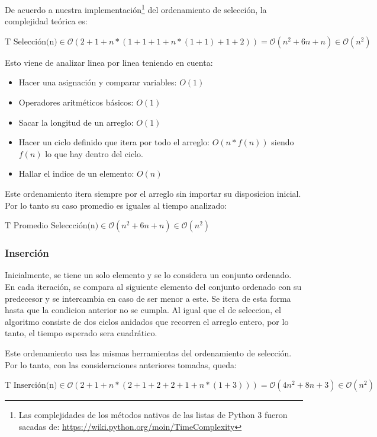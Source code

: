 \documentclass[article,a4paper]{article}
\begin{document}
De acuerdo a nuestra implementación\footnote{Las complejidades de los métodos nativos de las listas de Python 3 fueron sacadas de: \url{https://wiki.python.org/moin/TimeComplexity}} del ordenamiento de selección, la complejidad teórica es:

$\mbox{T Selección(n)} \in \mathcal O(2 + 1 + n * (1 + 1 + 1 + n * (1 + 1) + 1 + 2)) = \mathcal O(n^2 + 6n + n) \in \mathcal O(n^2)$

Esto viene de analizar linea por linea teniendo en cuenta:
\begin{itemize}
\item Hacer una asignación y comparar variables: $O(1)$
\item Operadores aritméticos básicos: $O(1)$
\item Sacar la longitud de un arreglo: $O(1)$
\item Hacer un ciclo definido que itera por todo el arreglo: $O(n * f(n))$ siendo $f(n)$ lo que hay dentro del ciclo.
\item Hallar el indice de un elemento: $O(n)$
\end{itemize}

Este ordenamiento itera siempre por el arreglo sin importar su disposicion inicial. Por lo tanto su caso promedio es iguales al tiempo analizado:

$\mbox{T Promedio Seleccción(n)} \in \mathcal O(n^2 + 6n + n) \in \mathcal O(n^2)$


\subsubsection{Inserción}

Inicialmente, se tiene un solo elemento y se lo considera un conjunto ordenado. En cada iteración, se compara al siguiente elemento del conjunto ordenado con su predecesor y se intercambia en caso de ser menor a este. Se itera de esta forma hasta que la condicion anterior no se cumpla. Al igual que el de seleccion, el algoritmo consiste de dos ciclos anidados que recorren el arreglo entero, por lo tanto, el tiempo esperado sera cuadrático.

Este ordenamiento usa las mismas herramientas del ordenamiento de selección. Por lo tanto, con las consideraciones anteriores tomadas, queda:

$\mbox{T Inserción(n)} \in \mathcal O( 2 + 1 + n * (2 + 1 + 2 + 2 + 1 + n * (1 + 3))) = \mathcal O(4n^2 + 8n + 3) \in \mathcal O(n^2)$\\
\end{document}
